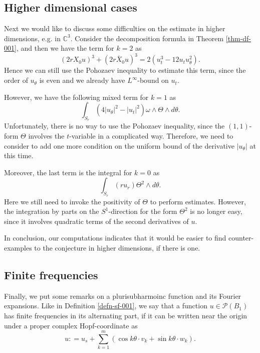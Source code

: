 \documentclass[a4paper,11pt]{amsart}
\numberwithin{equation}{section}
\def\cP{{\mathcal P}}
\def\cP{{\mathcal P}}
\def\bC{{\mathbb C}}
\begin{document}
\subsection{Higher dimensional cases}
\label{sec-61}

Next we would like to discuss some difficulties on the estimate in higher dimensions, e.g. in $\bC^3$. 
Consider the decomposition formula in Theorem \ref{thm-df-001}, 
and then we have the term for $k=2$ as 
$$ ( 2rX_0 u )^3 + (2r \bar X_0 u)^3 =  2 (u^3_t - 12 u_t u_{\theta}^2 ).$$
Hence we can still use the Pohozaev inequality to estimate this term, 
since the order of $u_{\theta}$ is even and we already have $L^{\infty}$-bound on $u_t$. 

However, we have the following mixed term for $k=1$ as 
\begin{equation}
\label{rem-001}
\int_{S_r} \left( 4|u_{\theta}|^2 - |u_t|^2 \right) \omega \wedge \Theta \wedge d\theta.
\end{equation}
Unfortunately, there is no way to use the Pohozaev inequality, 
since the $(1,1)$-form $\Theta$ involves the $t$-variable in a complicated way.
Therefore, we need to consider to add one more condition on the uniform bound of the derivative $| u_{\theta} |$ at this time.

Moreover, the last term is the integral for $k=0$ as 
\begin{equation}
\label{rem-002}
\int_{S_r} (ru_r) \Theta^2 \wedge d\theta. 
\end{equation}
Here we still need to invoke the positivity of $\Theta$ to perform estimates. 
However, the integration by parts on the $S^1$-direction for the form $\Theta^2$ is no longer easy, 
since it involves quadratic terms of the second derivatives of $u$. 

In conclusion, 
our computations indicates that it would be easier 
to find counter-examples to the conjecture in higher dimensions, 
if there is one. 

\subsection{Finite frequencies}
Finally, we put some remarks on a plurisubharmoinc function and its Fourier expansions. 
Like in Definition \ref{defn-sf-001}, 
we say that a function $u\in \cP(B_1)$ has finite frequencies in its alternating part,  
if it can be written near the origin under a proper complex Hopf-coordinate as 
$$ u : = u_s +\sum_{k=1}^m \left( \cos k\theta \cdot v_k + \sin k\theta \cdot w_k \right). $$
\end{document}
